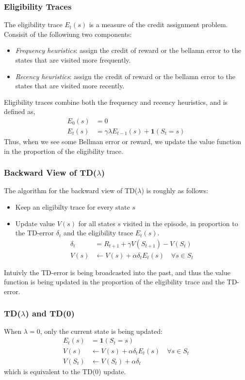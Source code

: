 \subsubsection{Eligibility Traces}
The eligibility trace \(E_t(s)\) is a measure of the credit assignment problem. 
Consisit of the followiung two components:
\begin{itemize}
    \item \emph{Frequency heuristics}: assign the credit of reward or the bellamn error to
    the states that are visited more frequently.
    \item \emph{Recency heuristics}: assign the credit of reward or the bellamn error to
    the states that are visited more recently.
\end{itemize}
Eligibility traces combine both the frequency and recency heuristics, and is defined as,
\[
    \begin{aligned}
        E_0(s) &= 0 \\
        E_t(s) &= \gamma\lambda E_{t-1}(s) + \bm{1}(S_t = s)      
    \end{aligned}
\]
Thus, when we see some Bellman error or reward, we update the value function in the proportion
of the eligibility trace. 


\subsubsection{Backward View of TD(\(\lambda \))}
The algorithm for the backward view of TD(\(\lambda \)) is roughly as follows:
\begin{itemize}
    \item Keep an eligibilty trace for every state \(s\)
    \item Update value \(V(s)\) for all states \(s\) visited in the episode, 
    in proportion to the TD-error \(\delta_t\) and the eligibility trace \(E_t(s)\).
    \[
        \begin{aligned}
            \delta _t &= R_{t+1} + \gamma V(S_{t+1}) - V(S_t) \\
            V(s) &\leftarrow V(s) + \alpha\delta_t E_t(s) \quad \forall s \in S_t
        \end{aligned}
    \] 
\end{itemize}
Intuivly the TD-error is being broadcasted into the past, and thus the value function is being
updated in the proportion of the eligibility trace and the TD-error. 

\subsubsection*{TD(\(\lambda \)) and TD(0)}
When \(\lambda = 0\), only the current state is being updated:
\[
    \begin{aligned}
        E_t(s) &= \bm{1}(S_t = s) \\
        V(s) &\leftarrow V(s) + \alpha\delta_t E_t(s) \quad \forall s \in S_t \\
        V(S_t) &\leftarrow V(S_t) + \alpha\delta_t
    \end{aligned}  
\]
which is equivalent to the TD(0) update.

